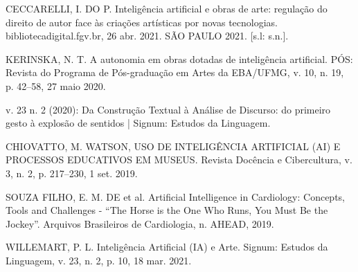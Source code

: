 \documentclass[12pt]{article}
\begin{document}
    CECCARELLI, I. DO P. Inteligência artificial e obras de arte: regulação do direito de autor face às criações artísticas por novas tecnologias. bibliotecadigital.fgv.br, 26 abr. 2021.  SÃO PAULO 2021. [s.l: s.n.].

    KERINSKA, N. T. A autonomia em obras dotadas de inteligência artificial. PÓS: Revista do Programa de Pós-graduação em Artes da EBA/UFMG, v. 10, n. 19, p. 42–58, 27 maio 2020.

    v. 23 n. 2 (2020): Da Construção Textual à Análise de Discurso: do primeiro gesto à explosão de sentidos | Signum: Estudos da Linguagem.

    CHIOVATTO, M. WATSON, USO DE INTELIGÊNCIA ARTIFICIAL (AI) E PROCESSOS EDUCATIVOS EM MUSEUS. Revista Docência e Cibercultura, v. 3, n. 2, p. 217–230, 1 set. 2019.

    SOUZA FILHO, E. M. DE et al. Artificial Intelligence in Cardiology: Concepts, Tools and Challenges - “The Horse is the One Who Runs, You Must Be the Jockey”. Arquivos Brasileiros de Cardiologia, n. AHEAD, 2019.

    WILLEMART, P. L. Inteligência Artificial (IA) e Arte. Signum: Estudos da Linguagem, v. 23, n. 2, p. 10, 18 mar. 2021.

    
	
\end{document}
